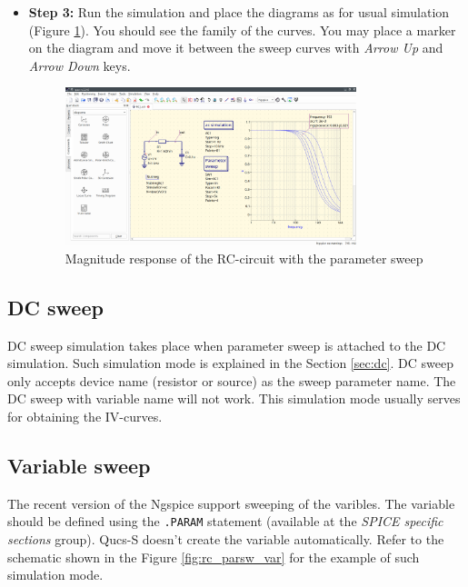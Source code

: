 \documentclass[a4paper,12pt]{article}
\begin{document}
\begin{itemize}
\item \textbf{Step 3:} Run the simulation and place the diagrams as for usual simulation (Figure \ref{fig:parsw_mr}). You should see the family of the curves. You may place a marker on the diagram and move it between the sweep curves with \emph{Arrow Up} and \emph{Arrow Down} keys.  
    
        \begin{figure}[!ht]
        \begin{center}
            \includegraphics[width=0.8\textwidth]{img/parsw_mr.png}
        \end{center}
        \caption{Magnitude response of the RC-circuit with the parameter sweep} 
    \label{fig:parsw_mr}
    \end{figure}
    
\end{itemize}


\subsection{DC sweep}

DC sweep simulation takes place when parameter sweep is attached to the DC simulation. Such simulation mode is explained in
the Section \ref{sec:dc}. DC sweep only accepts device name (resistor or source) as the sweep parameter name. The DC sweep with variable name will not work. This simulation mode usually serves for obtaining the IV-curves. 

\subsection{Variable sweep}

The recent version of the Ngspice support sweeping of the varibles. The variable should be defined using the \verb|.PARAM| 
statement (available at the \emph{SPICE specific sections} group). Qucs-S doesn't create the variable automatically. Refer to the schematic shown in the Figure \ref{fig:rc_parsw_var} for the example of such simulation mode.
\end{document}
